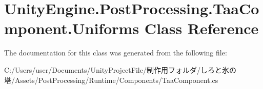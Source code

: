 \hypertarget{class_unity_engine_1_1_post_processing_1_1_taa_component_1_1_uniforms}{}\section{Unity\+Engine.\+Post\+Processing.\+Taa\+Component.\+Uniforms Class Reference}
\label{class_unity_engine_1_1_post_processing_1_1_taa_component_1_1_uniforms}


The documentation for this class was generated from the following file\+:\begin{DoxyCompactItemize}
\item 
C\+:/\+Users/user/\+Documents/\+Unity\+Project\+File/制作用フォルダ/しろと氷の塔/\+Assets/\+Post\+Processing/\+Runtime/\+Components/Taa\+Component.\+cs\end{DoxyCompactItemize}
